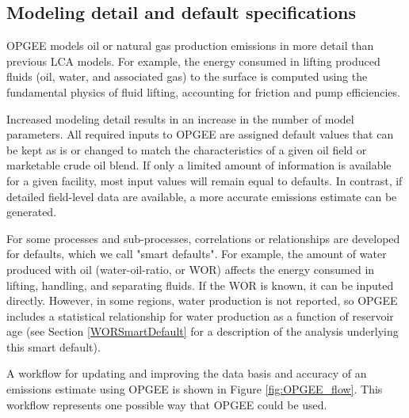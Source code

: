 \documentclass[11pt]{report}
\begin{document}
\subsection{Modeling detail and default specifications}

OPGEE models oil or natural gas production emissions in more detail than previous LCA models. For example, the energy consumed in lifting produced fluids (oil, water, and associated gas) to the surface is computed using the fundamental physics of fluid lifting, accounting for friction and pump efficiencies. 

Increased modeling detail results in an increase in the number of model parameters. All required inputs to OPGEE are assigned default values that can be kept as is or changed to match the characteristics of a given oil field or marketable crude oil blend. If only a limited amount of information is available for a given facility, most input values will remain equal to defaults. In contrast, if detailed field-level data are available, a more accurate emissions estimate can be generated.

For some processes and sub-processes, correlations or relationships are developed for defaults, which we call "smart defaults". For example, the amount of water produced with oil (water-oil-ratio, or WOR) affects the energy consumed in lifting, handling, and separating fluids. If the WOR is known, it can be inputed directly. However, in some regions, water production is not reported, so OPGEE includes a statistical relationship for water production as a function of reservoir age (see Section \ref{WORSmartDefault} for a description of the analysis underlying this smart default).

A workflow for updating and improving the data basis and accuracy of an emissions estimate using OPGEE is shown in Figure \ref{fig:OPGEE_flow}. This workflow represents one possible way that OPGEE could be used.
\end{document}
